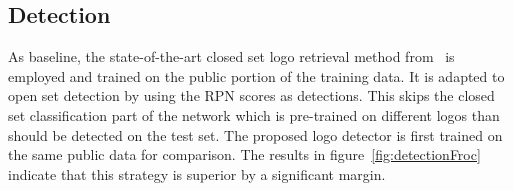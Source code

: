 \documentclass[a4paper,twoside]{article}
\begin{document}
\subsection{Detection}
As baseline, the state-of-the-art closed set logo retrieval method from~\cite{??} is employed and trained on the public portion of the training data.
It is adapted to open set detection by using the RPN scores as detections. This skips the closed set classification part of the network which is pre-trained on different logos than should be detected on the test set.
The proposed logo detector is first trained on the same public data for comparison. The results in figure~\ref{fig:detectionFroc} indicate that this strategy is superior by a significant margin. 
%
\end{document}
